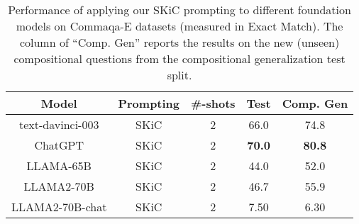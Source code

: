 \documentclass{article} %
\begin{document}
\begin{table}[ht]
\caption{Performance of applying our SKiC prompting to different foundation models on Commaqa-E datasets (measured in Exact Match). The column of ``Comp. Gen'' reports the results on the new (unseen) compositional questions from the compositional generalization test split.} \label{Tab:qa_results_llama2}
\centering
\small
\begin{tabular}{c|c|c|cc} \toprule
\textbf{Model}             & \textbf{Prompting} &\textbf{\#-shots} & \multicolumn{1}{l}{\textbf{Test}} & \multicolumn{1}{l}{\textbf{Comp. Gen}} \\ \midrule \midrule

\multirow{1}{*}{text-davinci-003} 
                           &  SKiC   &2  &66.0                     & 74.8                         \\ 
\multirow{1}{*}{ChatGPT}  
                           & SKiC   &2   & \textbf{70.0}                    & \textbf{80.8}                 \\ \midrule

\multirow{1}{*}{LLAMA-65B} 
                           &  SKiC &2    & 44.0                     & 52.0                         \\ 

\multirow{1}{*}{LLAMA2-70B} 
                           &  SKiC &2    &46.7                  & 55.9                         \\ 
\multirow{1}{*}{LLAMA2-70B-chat} 
                           &  SKiC &2    & 7.50                     & 6.30                        \\ \bottomrule        
\end{tabular} 
\end{table}
\end{document}
